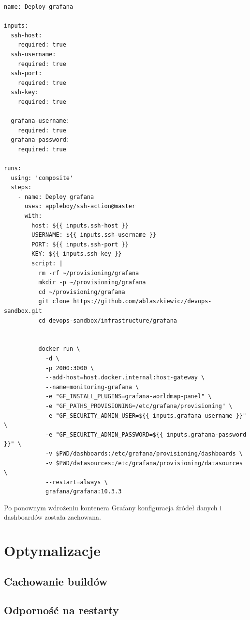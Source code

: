 \documentclass{article}
\begin{document}
\begin{lstlisting}[caption=Zmodyfikowany plik \texttt{.github/templates/deploy-grafana/action.yml}]
name: Deploy grafana

inputs:
  ssh-host:
    required: true
  ssh-username:
    required: true
  ssh-port:
    required: true
  ssh-key:
    required: true

  grafana-username:
    required: true
  grafana-password:
    required: true

runs:
  using: 'composite'
  steps:
    - name: Deploy grafana
      uses: appleboy/ssh-action@master
      with:
        host: ${{ inputs.ssh-host }}
        USERNAME: ${{ inputs.ssh-username }}
        PORT: ${{ inputs.ssh-port }}
        KEY: ${{ inputs.ssh-key }}
        script: |
          rm -rf ~/provisioning/grafana
          mkdir -p ~/provisioning/grafana
          cd ~/provisioning/grafana
          git clone https://github.com/ablaszkiewicz/devops-sandbox.git
          cd devops-sandbox/infrastructure/grafana


          docker run \
            -d \
            -p 2000:3000 \
            --add-host=host.docker.internal:host-gateway \
            --name=monitoring-grafana \
            -e "GF_INSTALL_PLUGINS=grafana-worldmap-panel" \
            -e "GF_PATHS_PROVISIONING=/etc/grafana/provisioning" \
            -e "GF_SECURITY_ADMIN_USER=${{ inputs.grafana-username }}" \
            -e "GF_SECURITY_ADMIN_PASSWORD=${{ inputs.grafana-password }}" \
            -v $PWD/dashboards:/etc/grafana/provisioning/dashboards \
            -v $PWD/datasources:/etc/grafana/provisioning/datasources \
            --restart=always \
            grafana/grafana:10.3.3
\end{lstlisting}

Po ponownym wdrożeniu kontenera Grafany konfiguracja źródeł danych i dashboardów została zachowana.

\section{Optymalizacje}
\subsection{Cachowanie buildów}
\subsection{Odporność na restarty}
\end{document}
